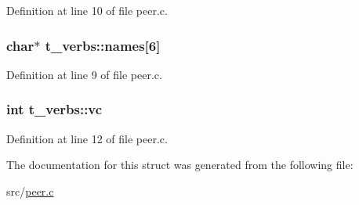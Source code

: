 Definition at line 10 of file peer.\-c.

\hypertarget{structt__verbs_af1c2f7666f6e1dc69cd11da8d6ceee15}{
\subsubsection[{names}]{\setlength{\rightskip}{0pt plus 5cm}char$\ast$ t\-\_\-verbs\-::names\mbox{[}6\mbox{]}}}\label{structt__verbs_af1c2f7666f6e1dc69cd11da8d6ceee15}


Definition at line 9 of file peer.\-c.

\hypertarget{structt__verbs_ad987fd901ce7ac02aa963245ae47a361}{
\subsubsection[{vc}]{\setlength{\rightskip}{0pt plus 5cm}int t\-\_\-verbs\-::vc}}\label{structt__verbs_ad987fd901ce7ac02aa963245ae47a361}


Definition at line 12 of file peer.\-c.



The documentation for this struct was generated from the following file\-:\begin{DoxyCompactItemize}
\item 
src/\hyperlink{peer_8c}{peer.\-c}\end{DoxyCompactItemize}
